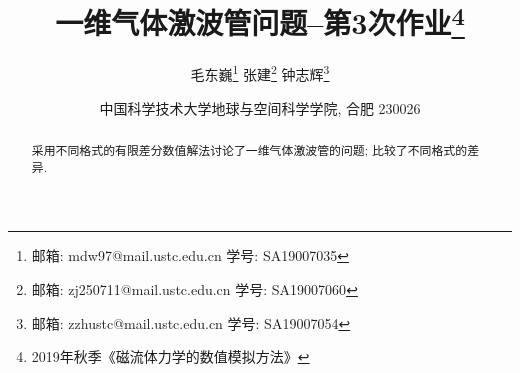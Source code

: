 \documentclass[10.5pt
]{article}
\begin{document}
\renewcommand{\refname}{参考文献}
\renewcommand{\figurename}{图}
\renewcommand{\abstractname}{摘要}

\title{一维气体激波管问题--第3次作业\footnote{2019年秋季《磁流体力学的数值模拟方法》}}

\author{
毛东巍\footnote{邮箱: mdw97@mail.ustc.edu.cn  学号: SA19007035}\quad 
张建\footnote{邮箱: zj250711@mail.ustc.edu.cn  学号: SA19007060}\quad 
钟志辉\footnote{邮箱: zzhustc@mail.ustc.edu.cn  学号: SA19007054}
}

\date{%
\scriptsize%
中国科学技术大学地球与空间科学学院, 合肥 230026
%
}

\maketitle

\begin{abstract}
采用不同格式的有限差分数值解法讨论了一维气体激波管的问题; 比较了不同格式的差异. 
\end{abstract}
\end{document}
